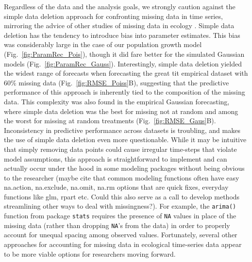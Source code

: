 \documentclass{article}
\begin{document}
\begin{linenumbers}
Regardless of the data and the analysis goals, we strongly caution against the simple data deletion approach for confronting missing data in time series, mirroring the advice of other studies of missing data in ecology \citep[e.g.,][]{nakagawa_model_2011, Shoari2018_mnar,lopucki2022handling}. Simple data deletion has the tendency to introduce bias into parameter estimates. This bias was considerably large in the case of our population growth model (Fig.\ \ref{fig:ParamRec_Pois}), though it did fare better for the simulated Gaussian models (Fig.\ \ref{fig:ParamRec_Gauss}). Interestingly, simple data deletion yielded the widest range of forecasts when forecasting the great tit empirical dataset with 60\% missing data (Fig.\ \ref{fig:RMSE_Poiss}B), suggesting that the predictive performance of this approach is inherently tied to the composition of the missing data. This complexity was also found in the empirical Gaussian forecasting, where simple data deletion was the best for missing not at random and among the worst for missing at random treatments (Fig.\ \ref{fig:RMSE_Gaus}B). Inconsistency in predictive performance across datasets is troubling, and makes the use of simple data deletion even more questionable. While it may be intuitive that simply removing data points could cause irregular time-steps that violate model assumptions, this approach is straightforward to implement and can actually occur under the hood in some modeling packages without being obvious to the researcher (maybe cite that common modeling functions often have easy na.action, na.exclude, na.omit, na.rm options that are quick fixes, everyday functions like glm, rpart etc. Could this also serve as a call to develop methods streamlining other ways to deal with missingness?). For example, the \texttt{arima()} function from package \texttt{stats} requires the presence of \texttt{NA} values in place of the missing data (rather than dropping \texttt{NA}'s from the data) in order to properly account for unequal spacing among observed values. Fortunately, several other approaches for accounting for missing data in ecological time-series data appear to be more viable options for researchers moving forward.


\end{linenumbers}
\end{document}

